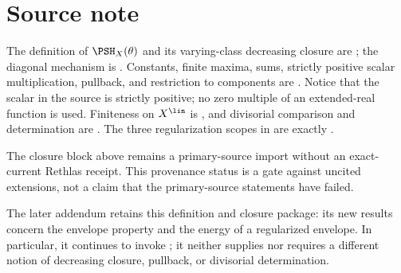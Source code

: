 \section{Source note}

The definition of \(\PSH_X(\theta)\) and its varying-class decreasing
closure are \cite[Definition~4.1 and Theorem~4.5]{BJ22}; the diagonal
mechanism is \cite[Lemma~4.6]{BJ22}.  Constants, finite maxima, sums,
strictly positive scalar multiplication, pullback, and restriction to
components are \cite[Theorem~4.7]{BJ22}.  Notice that the scalar in the
source is strictly positive; no zero multiple of an extended-real function
is used.  Finiteness on \(X^{\lin}\) is
\cite[Corollary~4.17]{BJ22}, and divisorial comparison and determination are
\cite[Theorem~4.22 and Corollary~4.23]{BJ22}.
The three regularization scopes in  are
exactly \cite[Theorem~4.15\,(i)--(iii)]{BJ22}.

The closure block above remains a primary-source import without an
exact-current Rethlas receipt.  This provenance status is a gate against
uncited extensions, not a claim that the primary-source statements have
failed.

The later addendum \cite{BJ22b} retains this definition and closure package:
its new results concern the envelope property and the energy of a regularized
envelope.  In particular, it continues to invoke
\cite[Theorems~4.5 and~4.22]{BJ22}; it neither supplies nor requires a
different notion of decreasing closure, pullback, or divisorial
determination.
